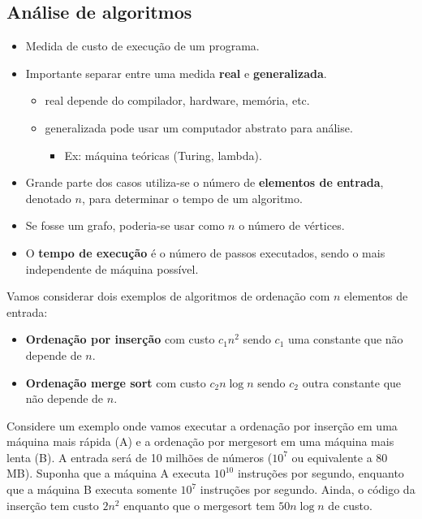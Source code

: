\subsection{Análise de algoritmos}

\begin{itemize}
\item Medida de custo de execução de um programa.
\item Importante separar entre uma medida {\bf real}  e {\bf generalizada}.
	\begin{itemize}
	\item real depende do compilador, hardware, memória, etc.
	\item generalizada pode usar um computador abstrato para análise.
		\begin{itemize}
		\item Ex: máquina teóricas (Turing, lambda).
		\end{itemize}
	\end{itemize}
\item Grande parte dos casos utiliza-se o número de {\bf elementos de entrada}, denotado $n$, para
determinar o tempo de um algoritmo.
\item Se fosse um grafo, poderia-se usar como $n$ o número de vértices.
\item O {\bf tempo de execução} é o número de passos executados, sendo o mais independente de 
máquina possível.
\end{itemize}

Vamos considerar dois exemplos de algoritmos de ordenação com $n$ elementos de entrada:
\begin{itemize}
\item {\bf Ordenação por inserção} com custo $c_1 n^2$ sendo $c_1$ uma constante que não depende de $n$.
\item {\bf Ordenação merge sort} com custo $c_2 n \log n$ sendo $c_2$ outra constante que não depende de $n$.
\end{itemize}

Considere um exemplo onde vamos executar a ordenação por inserção em uma máquina mais rápida (A)
e a ordenação por mergesort em uma máquina mais lenta (B).
A entrada será de 10 milhões de números ($10^7$ ou equivalente a $80$ MB).
Suponha que a máquina A executa $10^10$ instruções por segundo, enquanto que a máquina B executa
somente $10^7$ instruções por segundo. 
Ainda, o código da inserção tem custo $2n^2$ enquanto que o mergesort tem $50n \log n$ de custo.

